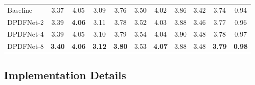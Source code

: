 \documentclass[final,5p,times,authoryear]{elsarticle}
\begin{document}
\begin{table}
\begin{tabular}{lcccccccccc}
    \midrule
    Baseline & 3.37 & 4.05 & 3.09 & 3.76 & 3.50 & 4.02 & 3.86 & 3.42 & 3.74 & \cellcolor{prismblue}0.94 \\
    DPDFNet-2 & 3.39 & \textbf{4.06} & 3.11 & 3.78 & 3.52 & 4.03 & 3.88 & 3.46 & 3.77 & \cellcolor{prismblue}0.96 \\
    DPDFNet-4 & 3.39 & 4.05 & 3.10 & 3.79 & 3.54 & 4.04 & 3.90 & 3.48 & 3.78 & \cellcolor{prismblue}0.97 \\
    DPDFNet-8 & \textbf{3.40} & \textbf{4.06} & \textbf{3.12} & \textbf{3.80} & 3.53 & \textbf{4.07} & 3.88 & 3.48 & \textbf{3.79} & \cellcolor{prismblue}\textbf{0.98} \\
    \bottomrule
    \end{tabular}
    \label{tab:csv_full_results}
\end{table}




\subsection{Implementation Details}
\label{sec:impl_details}
\end{document}
